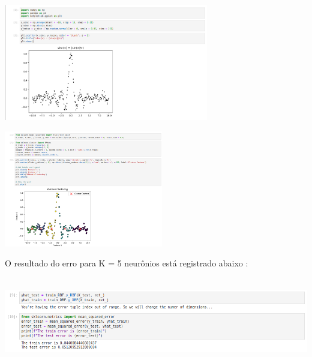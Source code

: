 \documentclass{article}
\begin{document}
\begin{center}

\includegraphics[height=2in]{sinc_data.png}
    
\end{center}

\vspace{10pt}

\begin{center}

\includegraphics[height=2in]{sinc_cluster.png}
        
\end{center}

\vspace{10pt}

O resultado do erro para K = 5 neurônios está registrado abaixo : 

\vspace{10pt}

\begin{center}

\includegraphics[height=1.5in]{error.png}
    
\end{center}
\end{document}
